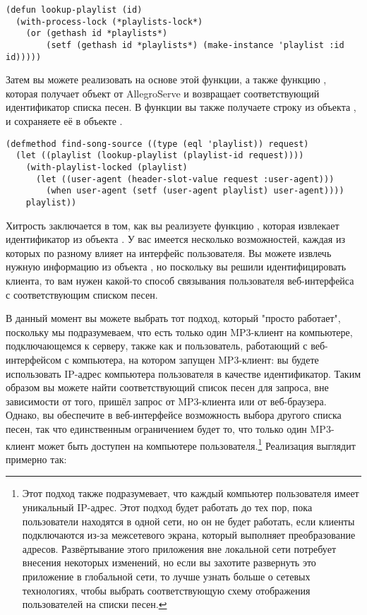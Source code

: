 \begin{lstlisting}
(defun lookup-playlist (id)
  (with-process-lock (*playlists-lock*)
    (or (gethash id *playlists*)
        (setf (gethash id *playlists*) (make-instance 'playlist :id id)))))
\end{lstlisting}

Затем вы можете реализовать  на основе этой функции, а также
функцию , которая получает объект  от AllegroServe и
возвращает соответствующий идентификатор списка песен.  В функции 
вы также получаете строку  из объекта , и сохраняете её в
объекте .

\begin{lstlisting}
(defmethod find-song-source ((type (eql 'playlist)) request)
  (let ((playlist (lookup-playlist (playlist-id request))))
    (with-playlist-locked (playlist)
      (let ((user-agent (header-slot-value request :user-agent)))
        (when user-agent (setf (user-agent playlist) user-agent))))
    playlist))
\end{lstlisting}

Хитрость заключается в том, как вы реализуете функцию , которая
извлекает идентификатор из объекта .  У вас имеется несколько возможностей,
каждая из которых по разному влияет на интерфейс пользователя.  Вы можете извлечь нужную
информацию из объекта , но поскольку вы решили идентифицировать клиента, то
вам нужен какой-то способ связывания пользователя веб-интерфейса с соответствующим списком
песен.

В данный момент вы можете выбрать тот подход, который "просто работает", поскольку мы
подразумеваем, что есть только один MP3-клиент на компьютере, подключающемся к серверу,
также как и пользователь, работающий с веб-интерфейсом с компьютера, на котором запущен
MP3-клиент: вы будете использовать IP-адрес компьютера пользователя в качестве
идентификатор.  Таким образом вы можете найти соответствующий список песен для запроса,
вне зависимости от того, пришёл запрос от MP3-клиента или от веб-браузера.  Однако, вы
обеспечите в веб-интерфейсе возможность выбора другого списка песен, так что единственным
ограничением будет то, что только один MP3-клиент может быть доступен на компьютере
пользователя.\footnote{Этот подход также подразумевает, что каждый компьютер пользователя
  имеет уникальный IP-адрес.  Этот подход будет работать до тех пор, пока пользователи
  находятся в одной сети, но он не будет работать, если клиенты подключаются из-за
  межсетевого экрана, который выполняет преобразование адресов.  Развёртывание этого
  приложения вне локальной сети потребует внесения некоторых изменений, но если вы
  захотите развернуть это приложение в глобальной сети, то лучше узнать больше о сетевых
  технологиях, чтобы выбрать соответствующую схему отображения пользователей на списки
  песен.}  Реализация  выглядит примерно так:


